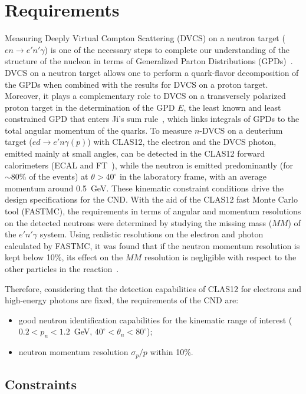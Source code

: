 \section{Requirements}

Measuring Deeply Virtual Compton Scattering (DVCS) on a neutron target ($en \to e' n' \gamma$) is one of the necessary steps to complete
our understanding of the structure of the nucleon in terms of Generalized Parton Distributions (GPDs)~\cite{Mueller:1998fv,Ji:1996ek,Radyushkin:1996nd}.
DVCS on a neutron target allows one to perform a quark-flavor decomposition of the GPDs when combined with the results for DVCS on a proton target.
Moreover, it plays a complementary role to DVCS on a transversely polarized proton target in the determination of the GPD $E$, the least known and least
constrained GPD that enters Ji's sum rule~\cite{Ji:1996ek}, which links integrals of GPDs to the total angular momentum of the quarks.
To measure $n$-DVCS on a deuterium target ($ed\to e'n\gamma(p)$) with CLAS12, the electron and the DVCS photon, emitted mainly at small angles, can be detected in the CLAS12 forward calorimeters (ECAL \cite{ec-nim} and FT~\cite{ft-nim}), while the neutron is emitted predominantly (for $\sim$80\% of the events) at $\theta> 40^\circ$ in the laboratory frame, with an average momentum around 0.5~GeV.
These kinematic constraint conditions drive the design specifications for the CND. 
With the aid of the CLAS12 fast Monte Carlo tool (FASTMC), the requirements in terms of angular and momentum resolutions on the detected neutrons were determined by studying the missing mass ($MM$) of the $e'n'\gamma$ system.
Using realistic resolutions on the electron and photon calculated by FASTMC, it was found that if the neutron momentum resolution is kept below 10\%, its effect on the $MM$ resolution is negligible with respect to the other particles in the reaction~\cite{Niccolai:2018qzm}. 

Therefore, considering that the detection capabilities of CLAS12 for electrons and high-energy photons are fixed, the requirements of the CND are:
\begin{itemize}
\item{good neutron identification capabilities for the kinematic range of interest ($0.2<p_n<1.2$~GeV, $40^\circ<\theta_n<80^\circ$);}
\item{neutron momentum resolution $\sigma_p/p$ within 10\%.}
\end{itemize}

\subsection{Constraints}
\label{sect_constraints}

